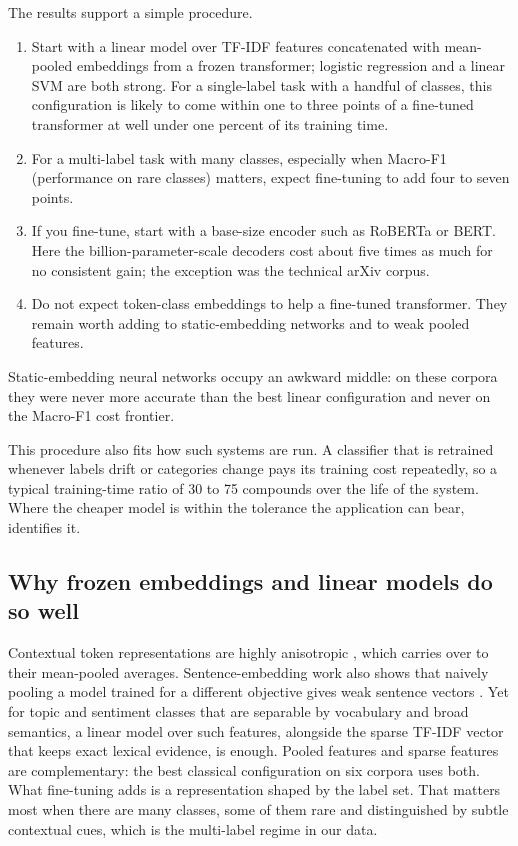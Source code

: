 \documentclass{ijis}
\begin{document}
The results support a simple procedure.
\begin{enumerate}
\setlength\itemsep{1pt}
\item Start with a linear model over TF-IDF features concatenated with mean-pooled embeddings from a frozen transformer; logistic regression and a linear SVM are both strong. For a single-label task with a handful of classes, this configuration is likely to come within one to three points of a fine-tuned transformer at well under one percent of its training time.
\item For a multi-label task with many classes, especially when Macro-F1 (performance on rare classes) matters, expect fine-tuning to add four to seven points.
\item If you fine-tune, start with a base-size encoder such as RoBERTa or BERT. Here the billion-parameter-scale decoders cost about five times as much for no consistent gain; the exception was the technical arXiv corpus.
\item Do not expect token-class embeddings to help a fine-tuned transformer. They remain worth adding to static-embedding networks and to weak pooled features.
\end{enumerate}
Static-embedding neural networks occupy an awkward middle: on these corpora they were never more accurate than the best linear configuration and never on the Macro-F1 cost frontier.

This procedure also fits how such systems are run. A classifier that is retrained whenever labels drift or categories change pays its training cost repeatedly, so a typical training-time ratio of 30 to 75 compounds over the life of the system. Where the cheaper model is within the tolerance the application can bear,  identifies it.

\subsection{Why frozen embeddings and linear models do so well}

Contextual token representations are highly anisotropic \cite{ethayarajh2019contextual}, which carries over to their mean-pooled averages. Sentence-embedding work also shows that naively pooling a model trained for a different objective gives weak sentence vectors \cite{reimers2019sentence}. Yet for topic and sentiment classes that are separable by vocabulary and broad semantics, a linear model over such features, alongside the sparse TF-IDF vector that keeps exact lexical evidence, is enough. Pooled features and sparse features are complementary: the best classical configuration on six corpora uses both. What fine-tuning adds is a representation shaped by the label set. That matters most when there are many classes, some of them rare and distinguished by subtle contextual cues, which is the multi-label regime in our data.
\end{document}

